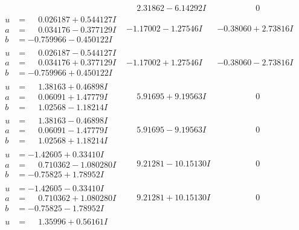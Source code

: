 \documentclass[1p]{elsarticle_modified}
\theoremstyle{definition}
\begin{document}
$$\begin{array}{c|c|c}
 & \phantom{-}2.31862 - 6.14292 I & \phantom{-0.000000 } 0 \\ \hline\begin{aligned}
u &= \phantom{-}0.026187 + 0.544127 I \\
a &= \phantom{-}0.034176 - 0.377129 I \\
b &= -0.759966 - 0.450122 I\end{aligned}
 & -1.17002 - 1.27546 I & -0.38060 + 2.73816 I \\ \hline\begin{aligned}
u &= \phantom{-}0.026187 - 0.544127 I \\
a &= \phantom{-}0.034176 + 0.377129 I \\
b &= -0.759966 + 0.450122 I\end{aligned}
 & -1.17002 + 1.27546 I & -0.38060 - 2.73816 I \\ \hline\begin{aligned}
u &= \phantom{-}1.38163 + 0.46898 I \\
a &= \phantom{-}0.06091 + 1.47779 I \\
b &= \phantom{-}1.02568 - 1.18214 I\end{aligned}
 & \phantom{-}5.91695 + 9.19563 I & \phantom{-0.000000 } 0 \\ \hline\begin{aligned}
u &= \phantom{-}1.38163 - 0.46898 I \\
a &= \phantom{-}0.06091 - 1.47779 I \\
b &= \phantom{-}1.02568 + 1.18214 I\end{aligned}
 & \phantom{-}5.91695 - 9.19563 I & \phantom{-0.000000 } 0 \\ \hline\begin{aligned}
u &= -1.42605 + 0.33410 I \\
a &= \phantom{-}0.710362 - 1.080280 I \\
b &= -0.75825 + 1.78952 I\end{aligned}
 & \phantom{-}9.21281 - 10.15130 I & \phantom{-0.000000 } 0 \\ \hline\begin{aligned}
u &= -1.42605 - 0.33410 I \\
a &= \phantom{-}0.710362 + 1.080280 I \\
b &= -0.75825 - 1.78952 I\end{aligned}
 & \phantom{-}9.21281 + 10.15130 I & \phantom{-0.000000 } 0 \\ \hline\begin{aligned}
u &= \phantom{-}1.35996 + 0.56161 I \\

\end{aligned}
\end{array}$$
\end{document}

